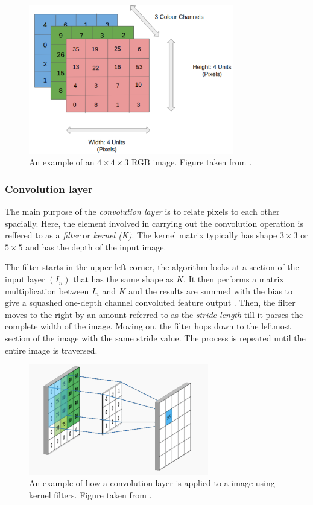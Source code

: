 \documentclass[../main.tex]{subfiles}
\begin{document}
\begin{figure}[!htb]
    \centering
    \includegraphics[width=0.8\textwidth]{doc/fig/rgb.png}
    \caption{An example of an \ensuremath{4\times4\times3} RGB image. Figure taken from \cite{sumit2018}.}
    \label{fig:rgb-input}
\end{figure} 

\subsubsection{Convolution layer}
The main purpose of the \textit{convolution layer} is to relate pixels to each other spacially. Here, the element involved in carrying out the convolution operation is reffered to as a \textit{filter} or \textit{kernel (K)}. The kernel matrix typically has shape \ensuremath{3\times3} or \ensuremath{5\times5} and has the depth of the input image.

The filter starts in the upper left corner, the algorithm looks at a section of the input layer \ensuremath{(I_n)} that has the same shape as $K$. It then performs a matrix multiplication between $I_n$ and $K$ and the results are summed with the bias to give a squashed one-depth channel convoluted feature output \cite{sumit2018}. Then, the filter moves to the right by an amount referred to as the \textit{stride length} till it parses the complete width of the image. Moving on, the filter hops down to the leftmost section of the image with the same stride value. The process is repeated until the entire image is traversed. 

\begin{figure}
    \centering
    \includegraphics[width=0.7\textwidth]{doc/fig/convolution.png}
    \caption{An example of how a convolution layer is applied to a image using kernel filters. Figure taken from \cite{stewart2019}.}
    \label{fig:convolution}
\end{figure}
\end{document}
